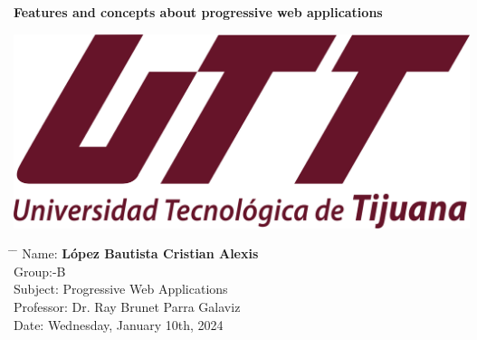 \documentclass[12pt,a4paper]{article}
\title{}
\author{}
\date{}
\begin{document}
	
	\newcommand{\subf}[2]{%
		{\small\begin{tabular}[t]{@{}c@{}}
				#1\\#2
		\end{tabular}}%
	}
	
	\begin{titlepage}
		\begin{center}
			\vspace*{3cm}
			
			\Huge
			\textbf{Features and concepts about progressive web applications}
			
			\vspace{0.8cm}
			\large
			
			\vspace{0.5cm}
			\LARGE
			
			
			\vspace{1.5cm}
			
			\textbf{}
            \includegraphics[width=.6\textwidth]{utt.png}
			
			\vfill
			
			
			
			\vspace{0.8cm}
			
			
			
			\Large
			
			
			
			
		\end{center}
		\Large
		\begin{tabbing}
			\hspace*{1em}\= \hspace*{8em} \= \kill %
			\> Name:\>  \textbf{López Bautista Cristian Alexis} \\
			\> Group:\>  10-B \\
			\> Subject:\>  Progressive Web Applications  \\
			\> Professor:  \> Dr. Ray Brunet Parra Galaviz \\
			\> Date: \>  Wednesday, January 10th, 2024
		\end{tabbing}
		
	\end{titlepage}
	
\end{document}
